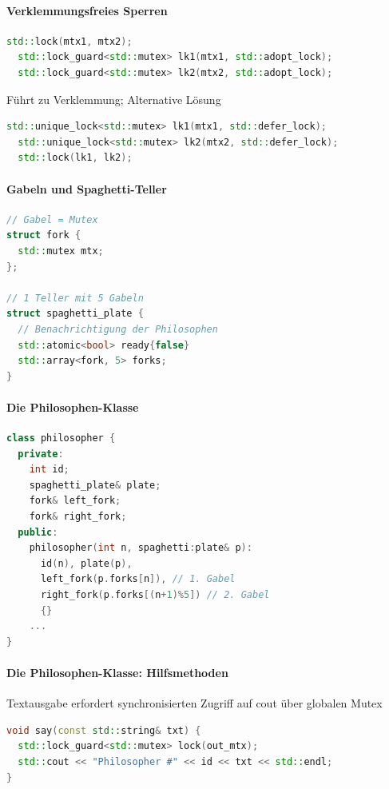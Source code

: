 \documentclass[10pt]{article}
\begin{document}
  \paragraph{Verklemmungsfreies Sperren}
  
  \begin{lstlisting}[language=C++]
  std::lock(mtx1, mtx2);
  std::lock_guard<std::mutex> lk1(mtx1, std::adopt_lock);
  std::lock_guard<std::mutex> lk2(mtx2, std::adopt_lock);
  \end{lstlisting}
  Führt zu Verklemmung; Alternative Lösung
  \begin{lstlisting}[language=C++]
  std::unique_lock<std::mutex> lk1(mtx1, std::defer_lock);
  std::unique_lock<std::mutex> lk2(mtx2, std::defer_lock);
  std::lock(lk1, lk2);
  \end{lstlisting}
  
  \paragraph{Gabeln und Spaghetti-Teller}
  \begin{lstlisting}[language=C++]
// Gabel = Mutex
struct fork {
  std::mutex mtx;
};

// 1 Teller mit 5 Gabeln
struct spaghetti_plate {
  // Benachrichtigung der Philosophen
  std::atomic<bool> ready{false}
  std::array<fork, 5> forks;
}
\end{lstlisting}
  
  \paragraph{Die Philosophen-Klasse}
  \begin{lstlisting}[language=C++]
class philosopher {
  private:
    int id;
    spaghetti_plate& plate;
    fork& left_fork;
    fork& right_fork;
  public:
    philosopher(int n, spaghetti:plate& p):
      id(n), plate(p), 
      left_fork(p.forks[n]), // 1. Gabel
      right_fork(p.forks[(n+1)%5]) // 2. Gabel
      {}
    ... 
}
\end{lstlisting}
  
  \paragraph{Die Philosophen-Klasse: Hilfsmethoden}
  
  Textausgabe erfordert synchronisierten Zugriff auf cout über globalen Mutex
  \begin{lstlisting}[language=C++]
void say(const std::string& txt) {
  std::lock_guard<std::mutex> lock(out_mtx);
  std::cout << "Philosopher #" << id << txt << std::endl;
}
\end{lstlisting}
  
\end{document}
